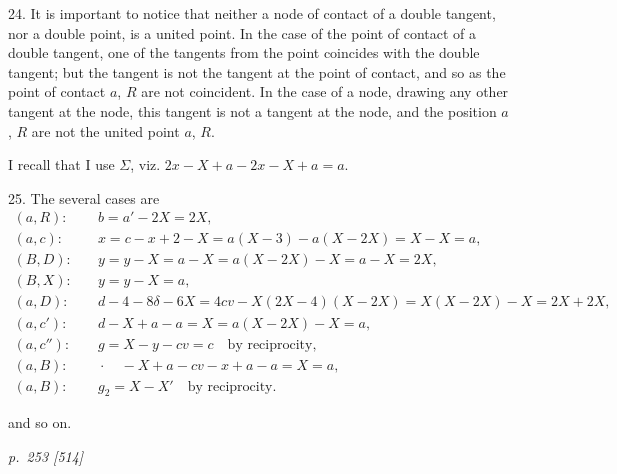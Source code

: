 \documentclass[11pt,a4paper]{book}
\begin{document}
24.  It is important to notice that neither a node of contact of a double tangent,
nor a double point, is a united point.  In the case of the point of contact of a double
tangent, one of the tangents from the point coincides with the double tangent; but
the tangent is not the tangent at the point of contact, and so as the point of contact
$a$, $R$ are not coincident.  In the case of a node, drawing any other tangent at the
node, this tangent is not a tangent at the node, and the position $a$, $R$ are not the
united point $a$, $R$.

I recall that I use $\Sigma$, viz. $2x - X + a - 2x - X + a = a$.

25.  The several cases are
\begin{align*}
(a, R): & \quad b = a' - 2X = 2X, \\
(a, c): & \quad x = c - x + 2 - X = a(X - 3) - a(X - 2X) = X - X = a, \\
(B, D): & \quad y = y - X = a - X = a(X - 2X) - X = a - X = 2X, \\
(B, X): & \quad y = y - X = a, \\
(a, D): & \quad d - 4 - 8\delta - 6X = 4cv - X(2X - 4)(X - 2X) = X(X - 2X) - X = 2X + 2X, \\
(a, c'): & \quad d - X + a - a = X = a(X - 2X) - X = a, \\
(a, c''): & \quad g = X - y - cv = c \quad \text{by reciprocity,} \\
(a, B): & \quad \cdot \quad - X + a - cv - x + a - a = X = a, \\
(a, B): & \quad g_2 = X - X' \quad \text{by reciprocity.}
\end{align*}

and so on.

\clearpage

\bigskip
\textit{p.~253 [514]}
\smallskip
\end{document}

